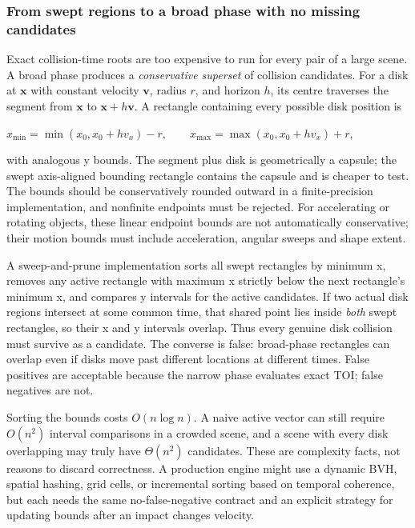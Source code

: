 \subsubsection{From swept regions to a broad phase with no missing candidates}\label{04-visual-computing-ii-ch026-from-swept-regions-to-a-broad-phase-with-no-missing-candidates}

Exact collision-time roots are too expensive to run for every pair of a large scene. A broad phase produces a \emph{conservative superset} of collision candidates. For a disk at \(\mathbf x\) with constant velocity \(\mathbf v\), radius \(r\), and horizon \(h\), its centre traverses the segment from \(\mathbf x\) to \(\mathbf x+h\mathbf v\). A rectangle containing every possible disk position is

\(x_{\min}=\min(x_0,x_0+hv_x)-r,\qquad x_{\max}=\max(x_0,x_0+hv_x)+r,\)

with analogous y bounds. The segment plus disk is geometrically a capsule; the swept axis-aligned bounding rectangle contains the capsule and is cheaper to test. The bounds should be conservatively rounded outward in a finite-precision implementation, and nonfinite endpoints must be rejected. For accelerating or rotating objects, these linear endpoint bounds are not automatically conservative; their motion bounds must include acceleration, angular sweeps and shape extent.

A sweep-and-prune implementation sorts all swept rectangles by minimum x, removes any active rectangle with maximum x strictly below the next rectangle's minimum x, and compares y intervals for the active candidates. If two actual disk regions intersect at some common time, that shared point lies inside \emph{both} swept rectangles, so their x and y intervals overlap. Thus every genuine disk collision must survive as a candidate. The converse is false: broad-phase rectangles can overlap even if disks move past different locations at different times. False positives are acceptable because the narrow phase evaluates exact TOI; false negatives are not.

Sorting the bounds costs \(O(n\log n)\). A naive active vector can still require \(O(n^2)\) interval comparisons in a crowded scene, and a scene with every disk overlapping may truly have \(\Theta(n^2)\) candidates. These are complexity facts, not reasons to discard correctness. A production engine might use a dynamic BVH, spatial hashing, grid cells, or incremental sorting based on temporal coherence, but each needs the same no-false-negative contract and an explicit strategy for updating bounds after an impact changes velocity.

